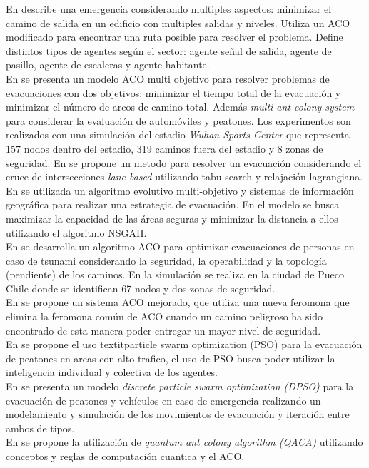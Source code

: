 \documentclass[letter, 10pt]{article}
\begin{document}
En \cite{rahman2007feasible} describe una emergencia considerando multiples aspectos: minimizar el camino de salida en un edificio con multiples salidas y niveles. Utiliza un ACO modificado para encontrar una ruta posible para resolver el problema. Define distintos tipos de agentes según el sector: agente señal de salida, agente de pasillo, agente de escaleras y agente habitante.\\
En \cite{zong2010multi,zong2010multiflow} se presenta un modelo ACO multi objetivo para resolver problemas de evacuaciones con dos objetivos: minimizar el tiempo total de la evacuación y minimizar el número de arcos de camino total. Además \textit{multi-ant colony system} para considerar la evaluación de automóviles y peatones. Los experimentos son realizados con una simulación del estadio \textit{Wuhan Sports Center} que representa 157 nodos dentro del estadio, 319 caminos fuera del estadio y 8 zonas de seguridad.
En \cite{xie2011lane} se propone un metodo para resolver un evacuación considerando el cruce de intersecciones \textit{lane-based} utilizando tabu search y relajación lagrangiana. \\
En \cite{saadatseresht2009evacuation} se utilizada un algoritmo evolutivo multi-objetivo y sistemas de información geográfica para realizar una estrategia de evacuación. En el modelo se busca maximizar la capacidad de las áreas seguras y minimizar la distancia a ellos utilizando el algoritmo NSGA\-II.\\
En \cite{forcael2014ant} se desarrolla un algoritmo ACO para optimizar evacuaciones de personas en caso de tsunami considerando la seguridad, la operabilidad y la topología (pendiente) de los caminos. En la simulación se realiza en la ciudad de Pueco Chile donde se identifican 67 nodos y dos zonas de seguridad.\\
En \cite{ohta2016improved} se propone un sistema ACO mejorado, que utiliza una nueva feromona que elimina la feromona común de ACO cuando un camino peligroso ha sido encontrado de esta manera poder entregar un mayor nivel de seguridad. \\
En \cite{izquierdo2009forecasting,zheng2012modeling} se propone el uso  textit{particle swarm optimization (PSO)} para la evacuación de peatones en areas con alto trafico, el uso de PSO busca poder utilizar la inteligencia individual y colectiva de los agentes.\\
En \cite{zong2014conflict} se presenta un modelo \textit{discrete particle swarm optimization (DPSO)} para la evacuación de peatones y vehículos en caso de emergencia realizando un modelamiento y simulación de los movimientos de evacuación y iteración entre ambos de tipos.\\
En \cite{liu2016evacuation} se propone la utilización de \textit{quantum ant colony algorithm (QACA)} utilizando conceptos y reglas de computación cuantica y el ACO.
\end{document}
